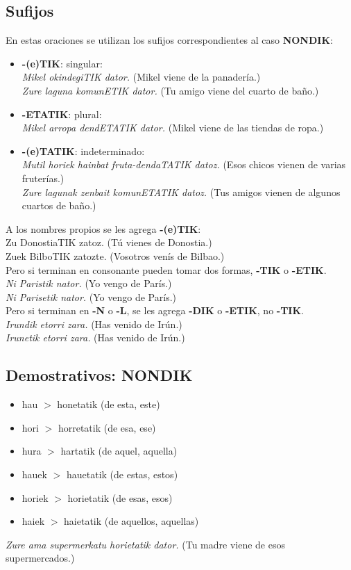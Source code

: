\documentclass[11pt, a4paper]{article}
\begin{document}
\subsection{Sufijos}
En estas oraciones se utilizan los sufijos correspondientes al caso \textbf{NONDIK}:
\begin{itemize}
\item \textbf{-(e)TIK}: singular:\\
\textit{Mikel okindegiTIK dator.}
(Mikel viene de la panadería.)\\
\textit{Zure laguna komunETIK dator.}
(Tu amigo viene del cuarto de baño.)
\item \textbf{-ETATIK}: plural:\\
\textit{Mikel arropa dendETATIK dator.}
(Mikel viene de las tiendas de ropa.)
\item \textbf{-(e)TATIK}: indeterminado:\\
\textit{Mutil horiek hainbat fruta-dendaTATIK datoz.} (Esos chicos vienen de varias fruterías.)\\
\textit{Zure lagunak zenbait komunETATIK datoz.} (Tus amigos vienen de algunos cuartos de baño.)
\end{itemize}
A los nombres propios se les agrega
\textbf{-(e)TIK}: \\
\indent Zu DonostiaTIK zatoz. (Tú vienes de Donostia.)\\
\indent Zuek BilboTIK zatozte. (Vosotros venís de Bilbao.)\\
Pero si terminan en consonante pueden tomar dos formas, \textbf{-TIK} o \textbf{-ETIK}.\\
\indent \textit{Ni Paristik nator.} (Yo vengo de París.)\\
\indent \textit{Ni Parisetik nator. }(Yo vengo de París.)\\
Pero si terminan en \textbf{-N} o \textbf{-L}, se les agrega \textbf{-DIK} o \textbf{-ETIK}, no \textbf{-TIK}.\\
\indent \textit{Irundik etorri zara.} (Has venido de Irún.)\\
\indent \textit{Irunetik etorri zara.} (Has venido de Irún.)

\subsection{Demostrativos: NONDIK}
\begin{multicols}{2}
\begin{itemize}
\item hau $>$ honetatik (de esta, este)
\item hori $>$ horretatik (de esa, ese)
\item hura $>$ hartatik (de aquel, aquella)
\item hauek $>$ hauetatik (de estas, estos)
\item horiek $>$ horietatik (de esas, esos)
\item haiek $>$ haietatik (de aquellos, aquellas)
\end{itemize}
\end{multicols}
\textit{Zure ama supermerkatu horietatik dator.} (Tu madre viene de esos supermercados.)
\end{document}
